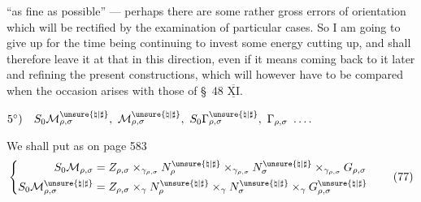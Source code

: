 
``as fine as possible'' --- perhaps there are
 some rather gross errors of orientation which
will be rectified by the examination of particular
cases. So I am going to give up
for the time being continuing to invest 
some energy  cutting up, and shall
therefore leave it at that in this direction, even if
it means coming back to it later and refining
the present constructions, which will
however have to be compared when the occasion arises with those
of \S~48 $\overline{\underline{\mathrm{XI}}}$.




$5^\circ)\quad S_0\mathcal{M}_{\rho,\sigma}^{\unsure{\natural|\sharp}},\ \mathcal{M}_{\rho,\sigma}^{\unsure{\natural|\sharp}},\ S_0\Gamma_{\rho,\sigma}^{\unsure{\natural|\sharp}},\ \Gamma_{\rho,\sigma}\ \ldots .$

We shall put as on page 583
\[
\left\{\begin{aligned}
S_0\mathcal{M}_{\rho,\sigma}
 &= Z_{\rho,\sigma}\times_{\gamma_{\rho,\sigma}}N_\rho^{\unsure{\natural|\sharp}}
 \times_{\gamma_{\rho,\sigma}}N_\sigma^{\unsure{\natural|\sharp}}
 \times_{\gamma_{\rho,\sigma}}G_{\rho,\sigma}\\
S_0\mathcal{M}_{\rho,\sigma}^{\unsure{\natural|\sharp}}
 &= Z_{\rho,\sigma}\times_\gamma N_\rho^{\unsure{\natural|\sharp}}
 \times_\gamma N_\sigma^{\unsure{\natural|\sharp}}\times_\gamma G_{\rho,\sigma}^{\unsure{\natural|\sharp}}
\end{aligned}\right.
\tag{77}
\]


